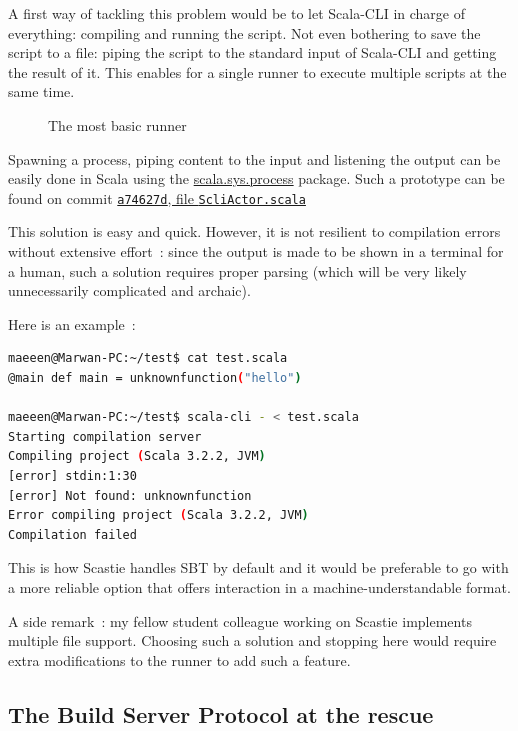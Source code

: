 \documentclass{article}
\begin{document}
A first way of tackling this problem would be to let Scala-CLI in charge of everything: compiling and running the script. Not even bothering to save the script to a file: piping the script to the standard input of Scala-CLI and getting the result of it. This enables for a single runner to execute multiple scripts at the same time.

\begin{figure}[H]
    \centering
    
    \caption{The most basic runner}
\end{figure}

Spawning a process, piping content to the input and listening the output can be easily done in Scala using the \href{https://dotty.epfl.ch/api/scala/sys/process.html}{scala.sys.process} package. Such a prototype can be found on commit \href{https://github.com/Maeeen/scastie/blob/a74627d080f70f664931133632f06f514a2856f8/scli-runner/src/main/scala/com.olegych.scastie.sclirunner/ScliActor.scala}{\lstinline{a74627d}, file \lstinline{ScliActor.scala}}

This solution is easy and quick. However, it is not resilient to compilation errors without extensive effort~: since the output is made to be shown in a terminal for a human, such a solution requires proper parsing (which will be very likely unnecessarily complicated and archaic).

Here is an example~: 

\begin{lstlisting}[language=bash,frame=tb,basicstyle={\small\ttfamily},frame=single]
maeeen@Marwan-PC:~/test$ cat test.scala
@main def main = unknownfunction("hello")

maeeen@Marwan-PC:~/test$ scala-cli - < test.scala
Starting compilation server
Compiling project (Scala 3.2.2, JVM)
[error] stdin:1:30
[error] Not found: unknownfunction
Error compiling project (Scala 3.2.2, JVM)
Compilation failed
\end{lstlisting}

This is how Scastie handles SBT by default and it would be preferable to go with a more reliable option that offers interaction in a machine-understandable format.

A side remark~: my fellow student colleague working on Scastie implements multiple file support. Choosing such a solution and stopping here would require extra modifications to the runner to add such a feature.

\subsection{The Build Server Protocol at the rescue}
\end{document}
